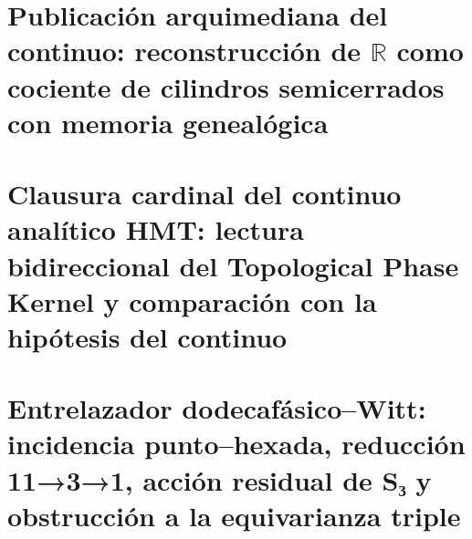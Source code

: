 \chapter{Publicación arquimediana del continuo: reconstrucción de \texorpdfstring{\(\mathbb R\)}{R} como cociente de cilindros semicerrados con memoria genealógica}
\label{chap:sucesor-102-18}

\begin{HMTSpiralIntegratedBody}

\end{HMTSpiralIntegratedBody}













\chapter{Clausura cardinal del continuo analítico HMT: lectura bidireccional del Topological Phase Kernel y comparación con la hipótesis del continuo}
\label{chap:sucesor-102-19}

















\chapter{Entrelazador dodecafásico–Witt: incidencia punto–hexada, reducción 11→3→1, acción residual de S₃ y obstrucción a la equivarianza triple}
\label{chap:sucesor-102-20}
\begin{HMTScientificOwnerSubordinated}

\end{HMTScientificOwnerSubordinated}












